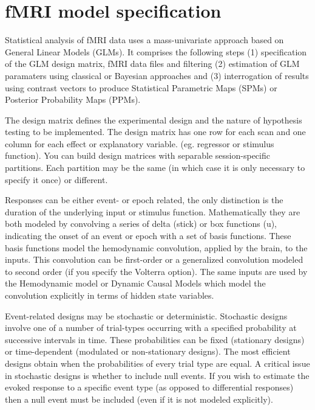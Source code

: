\documentclass[a4paper,titlepage]{book}
\begin{document}
\chapter{fMRI model specification}

Statistical analysis of fMRI data uses a mass-univariate approach based on General Linear Models (GLMs). It comprises the following steps (1) specification of the GLM design matrix, fMRI data files and filtering (2) estimation of GLM paramaters using classical or Bayesian approaches and (3) interrogation of results using contrast vectors to produce Statistical Parametric Maps (SPMs) or Posterior Probability Maps (PPMs).



The design matrix defines the experimental design and the nature of hypothesis testing to be implemented.  The design matrix has one row for each scan and one column for each effect or explanatory variable. (eg. regressor or stimulus function). You can build design matrices with separable session-specific partitions.  Each partition may be the same (in which case it is only necessary to specify it once) or different. 



Responses can be either event- or epoch related, the only distinction is the duration of the underlying input or stimulus function. Mathematically they are both modeled by convolving a series of delta (stick) or box functions (u), indicating the onset of an event or epoch with a set of basis functions.  These basis functions model the hemodynamic convolution, applied by the brain, to the inputs.  This convolution can be first-order or a generalized convolution modeled to second order (if you specify the Volterra option). The same inputs are used by the Hemodynamic model or Dynamic Causal Models which model the convolution explicitly in terms of hidden state variables. 


Event-related designs may be stochastic or deterministic.  Stochastic designs involve one of a number of trial-types occurring with a specified probability at successive intervals in time.  These probabilities can be fixed (stationary designs) or time-dependent (modulated or non-stationary designs).  The most efficient designs obtain when the probabilities of every trial type are equal. A critical issue in stochastic designs is whether to include null events. If you wish to estimate the evoked response to a specific event type (as opposed to differential responses) then a null event must be included (even if it is not modeled explicitly).
\end{document}
